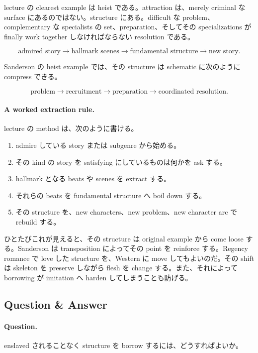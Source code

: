 lecture の clearest example は heist である。attraction は、merely criminal な surface にあるのではない。structure にある。difficult な problem、complementary な specialists の set、preparation、そしてその specializations が finally work together しなければならない resolution である。

\begin{equation}
\text{admired story} \to \text{hallmark scenes} \to \text{fundamental structure} \to \text{new story}.
\end{equation}

Sanderson の heist example では、その structure は schematic に次のように compress できる。

\begin{equation}
\text{problem} \to \text{recruitment} \to \text{preparation} \to \text{coordinated resolution}.
\end{equation}

\paragraph{A worked extraction rule.} lecture の method は、次のように書ける。
\begin{enumerate}
\item admire している story または subgenre から始める。
\item その kind の story を satisfying にしているものは何かを ask する。
\item hallmark となる beats や scenes を extract する。
\item それらの beats を fundamental structure へ boil down する。
\item その structure を、new characters、new problem、new character arc で rebuild する。
\end{enumerate}

ひとたびこれが見えると、その structure は original example から come loose する。Sanderson は transposition によってその point を reinforce する。Regency romance で love した structure を、Western に move してもよいのだ。その shift は skeleton を preserve しながら flesh を change する。また、それによって borrowing が imitation へ harden してしまうことも防げる。

\subsection{Question \& Answer}

\paragraph{Question.} enslaved されることなく structure を borrow するには、どうすればよいか。

